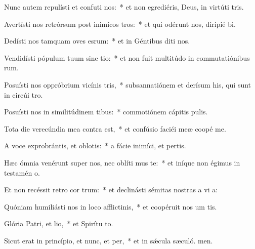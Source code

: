 \item Nunc autem repulísti et confuti nos:~* et non egrediéris, Deus, in virtúti tris.
\item Avertísti nos retrórsum post inimícos tros:~* et qui odérunt nos, diripié bi.
\item Dedísti nos tamquam oves esrum:~* et in Géntibus diti nos.
\item Vendidísti pópulum tuum sine tio:~* et non fuit multitúdo in commutatiónibus rum.
\item Posuísti nos oppróbrium vicínis tris,~* subsannatiónem et derísum his, qui sunt in circúi tro.
\item Posuísti nos in similitúdinem tibus:~* commotiónem cápitis  pulis.
\item Tota die verecúndia mea contra  est,~* et confúsio faciéi meæ coopé me.
\item A voce exprobrántis, et oblotis:~* a fácie inimíci, et pertis.
\item Hæc ómnia venérunt super nos, nec oblíti mus te:~* et iníque non égimus in testamén o.
\item Et non recéssit retro cor trum:~* et declinásti sémitas nostras a vi a:
\item Quóniam humiliásti nos in loco afflictinis,~* et coopéruit nos um tis.
\item Glória Patri, et lio,~* et Spirítu to.
\item Sicut erat in princípio, et nunc, et per,~* et in sǽcula sæculó. men.
